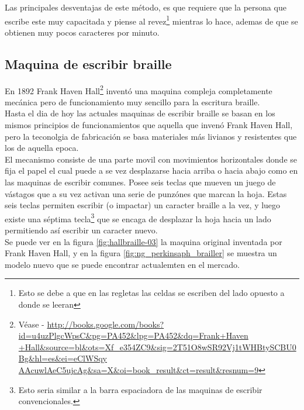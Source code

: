 Las principales desventajas de este m\'etodo, es que requiere que la persona
que escribe este muy capacitada y piense al revez\footnote{Esto se debe a que
en las regletas las celdas se escriben del lado opuesto a donde se leeran}
mientras lo hace, ademas de que se obtienen muy pocos caracteres por minuto.

\subsection{Maquina de escribir braille}
%
En 1892 Frank Haven Hall\footnote{V\'ease - \url{
http://books.google.com/books?id=u4uzPlgcWpsC&pg=PA452&lpg=PA452&dq=Frank+Haven
+Hall&source=bl&ots=Xf_e354ZC9&sig=2T51O8wSR92Vj1tWHBtySCBU0Bg&hl=es&ei=eClWSqy
AAcuwlAeC5ujcAg&sa=X&oi=book_result&ct=result&resnum=9}} invent\'o una maquina
compleja completamente mec\'anica pero de funcionamiento muy sencillo para la
escritura braille.\\

Hasta el dia de hoy las actuales maquinas de escribir braille se basan en los
mismos principios de funcionamientos que aquella que inven\'o Frank Haven Hall,
pero la teconolgia de fabricaci\'on se basa materiales m\'as livianos y
resistentes que los de aquella epoca. \\

El mecanismo consiste de una parte movil con movimientos horizontales donde se
fija el papel el cual puede a se vez desplazarse hacia arriba o hacia abajo
como en las maquinas de escribir comunes. Posee seis teclas que mueven un
juego de v\'astagos que a su vez activan una serie de punz\'ones que marcan la
hoja. Estas seis teclas permiten escribir (o impactar) un caracter braille a
la vez, y luego existe una s\'eptima tecla\footnote{Esto seria similar a la
barra espaciadora de las maquinas de escribir convencionales.} que se encaga de
desplazar la hoja hacia un lado permitiendo as\'i escribir un caracter nuevo.\\

Se puede ver en la figura \ref{fig:hallbraille-03} la maquina original
inventada por Frank Haven Hall, y en la figura
\ref{fig:ng_perkinsaph_brailler} se muestra un modelo nuevo que se puede
encontrar actualemten en el mercado.


